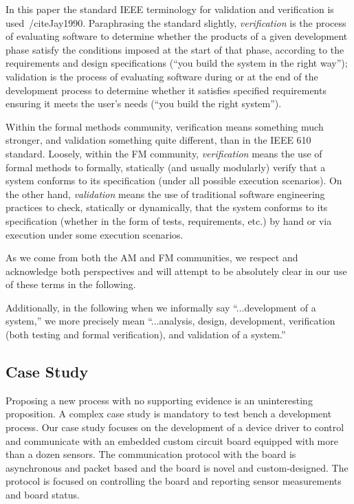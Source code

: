\documentclass[english]{lni}
\begin{document}
In this paper the standard IEEE terminology for validation and
verification is used~/cite{Jay1990}.  Paraphrasing the standard
slightly, \emph{verification} is the process of evaluating software to
determine whether the products of a given development phase satisfy
the conditions imposed at the start of that phase, according to the
requirements and design specifications (``you build the system in the
right way''); validation is the process of evaluating software during
or at the end of the development process to determine whether it
satisfies specified requirements ensuring it meets the user's needs
(``you build the right system'').

Within the formal methods community, verification means something much
stronger, and validation something quite different, than in the IEEE
610 standard.  Loosely, within the FM community, \emph{verification}
means the use of formal methods to formally, statically (and usually
modularly) verify that a system conforms to its specification (under
all possible execution scenarios).  On the other hand,
\emph{validation} means the use of traditional software engineering
practices to check, statically or dynamically, that the system
conforms to its specification (whether in the form of tests,
requirements, etc.) by hand or via execution under some execution
scenarios.

As we come from both the AM and FM communities, we respect and
acknowledge both perspectives and will attempt to be absolutely clear
in our use of these terms in the following.

Additionally, in the following when we informally say ``...development
of a system,'' we more precisely mean ``...analysis, design,
development, verification (both testing and formal verification), and
validation of a system.''

\subsection{Case Study}
\label{sec:case-study}

Proposing a new process with no supporting evidence is an
uninteresting proposition.  A complex case study is mandatory to test
bench a development process.  Our case study focuses on the
development of a device driver to control and communicate with an
embedded custom circuit board equipped with more than a dozen sensors.
The communication protocol with the board is asynchronous and packet
based and the board is novel and custom-designed.  The protocol is
focused on controlling the board and reporting sensor measurements and
board status.
\end{document}
